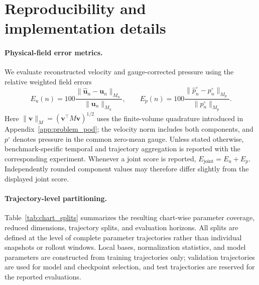\documentclass{article}
\begin{document}
\section{Reproducibility and implementation details}
\label{app:implementation}

\paragraph{Physical-field error metrics.}
We evaluate reconstructed velocity and gauge-corrected pressure using the relative weighted field errors
\begin{equation}
E_u(n)
=
100\frac{
\|\widehat{\bm u}_n-\bm u_n\|_{M_u}
}{
\|\bm u_n\|_{M_u}
},
\qquad
E_p(n)
=
100\frac{
\|\widehat p_n^\circ-p_n^\circ\|_{M_p}
}{
\|p_n^\circ\|_{M_p}
}.
\label{eq:field_errors}
\end{equation}
Here $\|\bm v\|_M=(\bm v^\top M\bm v)^{1/2}$ uses the finite-volume
quadrature introduced in Appendix~\ref{app:problem_pod}; the velocity norm includes both components, and $p^\circ$ denotes pressure in the common zero-mean gauge. Unless stated otherwise, benchmark-specific temporal and trajectory aggregation is reported with the corresponding experiment. Whenever a joint score is reported,
$E_{\mathrm{joint}}=E_u+E_p$. Independently rounded component values may therefore differ slightly from the displayed joint score.


\paragraph{Trajectory-level partitioning.}
Table~\ref{tab:chart_splits} summarizes the resulting chart-wise parameter coverage, reduced dimensions, trajectory splits, and evaluation horizons. All splits are defined at the level of complete parameter trajectories rather than individual snapshots or rollout windows. Local bases, normalization statistics, and model parameters are constructed from training trajectories only; validation trajectories are used for model and checkpoint selection, and test trajectories are reserved for the reported evaluations. 
\end{document}
